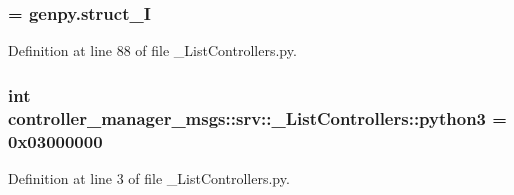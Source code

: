 \subsubsection[{\-\_\-struct\-\_\-\-I}]{ = genpy.\-struct\-\_\-\-I}\label{namespacecontroller__manager__msgs_1_1srv_1_1__ListControllers_a52e23865017f4d8816b534948b791a4f}


\-Definition at line 88 of file \-\_\-\-List\-Controllers.\-py.

\subsubsection[{python3}]{\setlength{\rightskip}{0pt plus 5cm}int {\bf controller\-\_\-manager\-\_\-msgs\-::srv\-::\-\_\-\-List\-Controllers\-::python3} = 0x03000000}\label{namespacecontroller__manager__msgs_1_1srv_1_1__ListControllers_a873752f10ac23ead0b8ffa4eba267696}


\-Definition at line 3 of file \-\_\-\-List\-Controllers.\-py.


